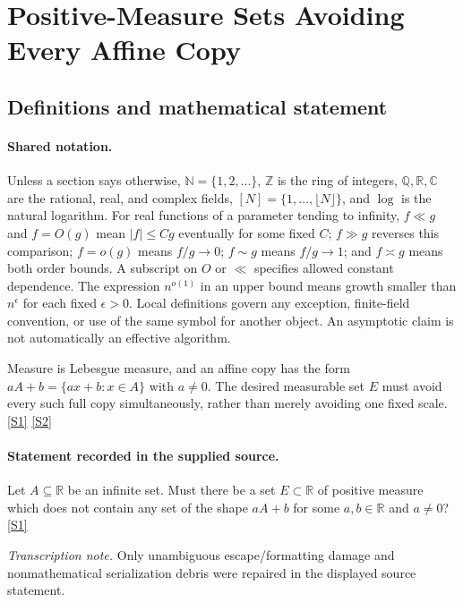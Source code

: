 \documentclass[11pt,a4paper]{article}
\newcommand{\N}{\mathbb{N}}
\newcommand{\Z}{\mathbb{Z}}
\newcommand{\Q}{\mathbb{Q}}
\newcommand{\R}{\mathbb{R}}
\newcommand{\C}{\mathbb{C}}
\newcommand{\sref}[2]{\hyperlink{source:#1:#2}{[S#2]}}
\begin{document}
\section{Positive-Measure Sets Avoiding Every Affine Copy}\label{statement}


\subsection{Definitions and mathematical statement}

\paragraph{Shared notation.}Unless a section says otherwise, $\N=\{1,2,\ldots\}$,
$\Z$ is the ring of integers, $\Q,\R,\C$ are the rational, real, and complex
fields, $[N]=\{1,\ldots,\lfloor N\rfloor\}$, and $\log$ is the natural
logarithm. For real functions of a parameter tending to infinity,
$f\ll g$ and $f=O(g)$ mean $|f|\leq Cg$ eventually for some fixed $C$;
$f\gg g$ reverses this comparison; $f=o(g)$ means $f/g\to0$;
$f\sim g$ means $f/g\to1$; and $f\asymp g$ means both order bounds.
A subscript on $O$ or $\ll$ specifies allowed constant dependence.
The expression $n^{o(1)}$ in an upper bound means growth smaller than
$n^\epsilon$ for each fixed $\epsilon>0$. Local definitions govern any
exception, finite-field convention, or use of the same symbol for another
object. An asymptotic claim is not automatically an effective algorithm.



Measure is Lebesgue measure, and an affine copy has the form $aA+b=\{ax+b:x\in A\}$ with $a\ne0$. The desired measurable set $E$ must avoid every such full copy simultaneously, rather than merely avoiding one fixed scale. \sref{statement}{1} \sref{statement}{2}

\paragraph{Statement recorded in the supplied source.}
Let $A\subseteq\mathbb{R}$ be an infinite set. Must there be a set $E\subset \mathbb{R}$ of positive measure which does not contain any set of the shape $aA+b$ for some $a,b\in\mathbb{R}$ and $a\neq 0$? \sref{statement}{1}

{\small\emph{Transcription note.} Only unambiguous escape/formatting damage and nonmathematical serialization debris were repaired in the displayed source statement.}
\end{document}
